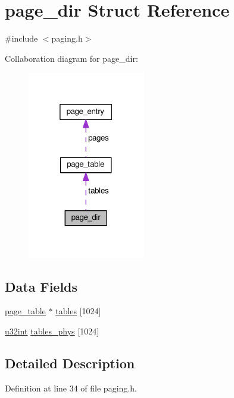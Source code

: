 \hypertarget{structpage__dir}{}\section{page\+\_\+dir Struct Reference}
\label{structpage__dir}


{\ttfamily \#include $<$paging.\+h$>$}



Collaboration diagram for page\+\_\+dir\+:\nopagebreak
\begin{figure}[H]
\begin{center}
\leavevmode
\includegraphics[width=145pt]{structpage__dir__coll__graph}
\end{center}
\end{figure}
\subsection*{Data Fields}
\begin{DoxyCompactItemize}
\item 
\hyperlink{structpage__table}{page\+\_\+table} $\ast$ \hyperlink{structpage__dir_ac89434e3fccabfe9481ea77fdda82faf}{tables} \mbox{[}1024\mbox{]}
\item 
\hyperlink{system_8h_a757de76cafbcddaac0d1632902fe4cb8}{u32int} \hyperlink{structpage__dir_a7336b695acaf516613dda626129129d0}{tables\+\_\+phys} \mbox{[}1024\mbox{]}
\end{DoxyCompactItemize}


\subsection{Detailed Description}


Definition at line 34 of file paging.\+h.



